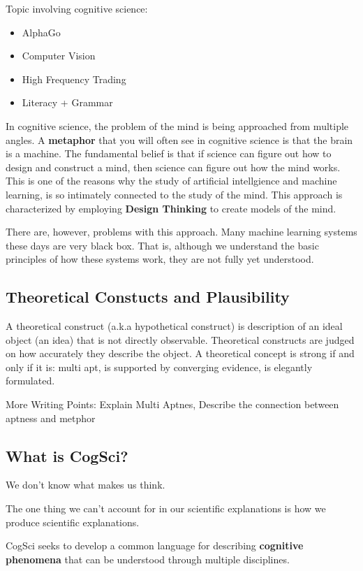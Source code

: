 \documentclass[twoside]{article}
\begin{document}
Topic involving cognitive science:
\begin{itemize}
  \item AlphaGo
  \item Computer Vision
  \item High Frequency Trading
  \item Literacy + Grammar
\end{itemize}

In cognitive science, the problem of the mind is being approached from multiple
angles. A \textbf{metaphor} that you will often see in cognitive science is that the brain
is a machine. The fundamental belief is that if science can figure out how to
design and construct a mind, then science can figure out how the mind works. This is
one of the reasons why the study of artificial intellgience and machine learning, is
so intimately connected to the study of the mind. This approach is characterized
by employing \textbf{Design Thinking} to create models of the mind.

There are, however, problems with this approach. Many machine learning systems these
days are very black box. That is, although we understand the basic principles
of how these systems work, they are not fully yet understood.

\subsection{Theoretical Constucts and Plausibility}

A theoretical construct (a.k.a hypothetical construct) is description of
an ideal object (an idea) that is not directly observable. Theoretical constructs
are judged on how accurately they describe the object. A theoretical concept is
strong if and only if it is: multi apt, is supported by converging evidence, is
elegantly formulated.

More Writing Points: Explain Multi Aptnes, Describe the connection between aptness
and metphor

\subsection{What is CogSci?}
We don't know what makes us think.

The one thing we can't account for in our scientific explanations is
how we produce scientific explanations.

CogSci seeks to develop a common language for describing \textbf{cognitive phenomena}
that can be understood through multiple disciplines.
\end{document}
